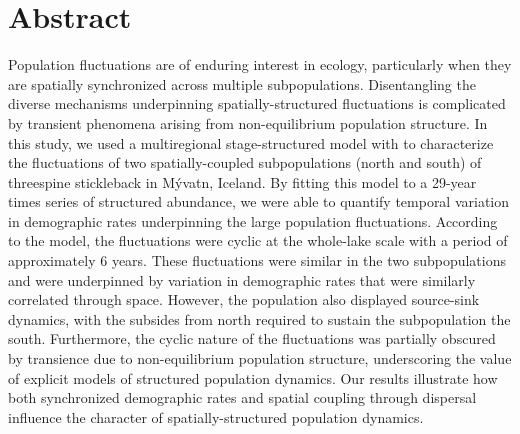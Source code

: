 
\section*{Abstract} \label{abstract}

Population fluctuations are of enduring interest in ecology,
particularly when they are spatially synchronized across 
multiple subpopulations.
Disentangling the diverse mechanisms underpinning spatially-structured fluctuations
is complicated by transient phenomena arising from non-equilibrium population structure.
In this study, we used a multiregional stage-structured model
with to characterize the  fluctuations of two spatially-coupled subpopulations
(north and south) of threespine stickleback in M\'{y}vatn, Iceland.
By fitting this model to a 29-year times series of structured abundance,
we were able to quantify temporal variation in demographic rates
underpinning the large population fluctuations.
According to the model, the fluctuations were cyclic
at the whole-lake scale with a period of approximately 6 years.
These fluctuations were similar in the two subpopulations 
and were underpinned by variation in demographic rates 
that were similarly correlated through space.
However, the population also displayed source-sink dynamics,
with the subsides from north required to sustain the subpopulation the south.
Furthermore, the cyclic nature of the fluctuations was partially obscured by transience
due to non-equilibrium population structure,
underscoring the value of explicit models of structured population dynamics.
Our results illustrate how both synchronized demographic rates and spatial coupling
through dispersal influence the character of spatially-structured population dynamics.


